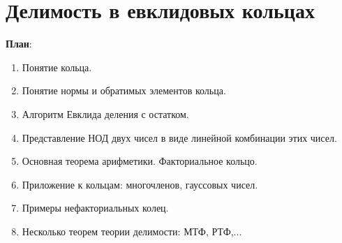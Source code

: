 \section{Делимость в евклидовых кольцах}


\textbf{План}:
\begin{enumerate}
\item Понятие кольца.
\item Понятие нормы и обратимых элементов кольца.
\item Алгоритм Евклида деления с остатком.
\item Представление НОД двух чисел в виде линейной комбинации этих чисел.
\item Основная теорема арифметики. Факториальное кольцо.
\item Приложение к кольцам: многочленов, гауссовых чисел.
\item Примеры нефакториальных колец.
\item Несколько теорем теории делимости: МТФ, РТФ,...
\end{enumerate}














